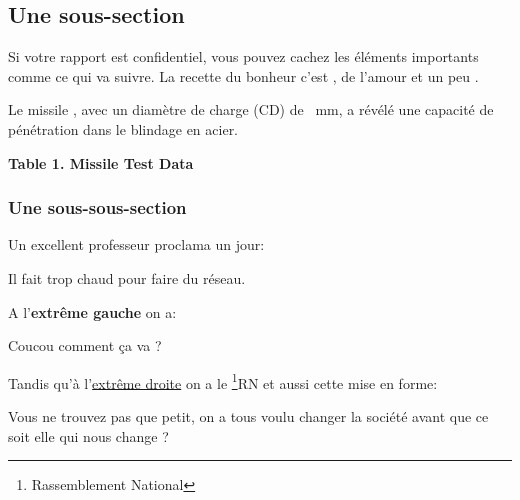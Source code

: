 \subsection{Une sous-section}
Si votre rapport est confidentiel, vous pouvez cachez les éléments importants comme ce qui va suivre.
La recette du bonheur c'est , de l'amour et un peu .

Le missile , avec un diamètre de charge (CD) de
~mm, a révélé une capacité de pénétration dans le blindage
en acier.
\begin{table}[ht]
    \begin{center}
        \textbf{Table 1.  Missile Test Data}\\
        \end{center}
\end{table}


\subsubsection{Une sous-sous-section}
Un excellent professeur proclama un jour:
\begin{center}
Il fait trop chaud pour faire du réseau.
\end{center}

A l'\textbf{extrême gauche} on a:
\begin{flushleft}
    Coucou comment ça va ?
\end{flushleft}

Tandis qu'à l'\underline{extrême droite} on a le \href{https://rassemblementnational.fr/}{\footnote{Rassemblement National}{RN}} et aussi cette mise en forme:

\begin{flushright}
    Vous ne trouvez pas que petit, on a tous voulu changer la société avant que ce soit elle qui nous change ?
\end{flushright}

